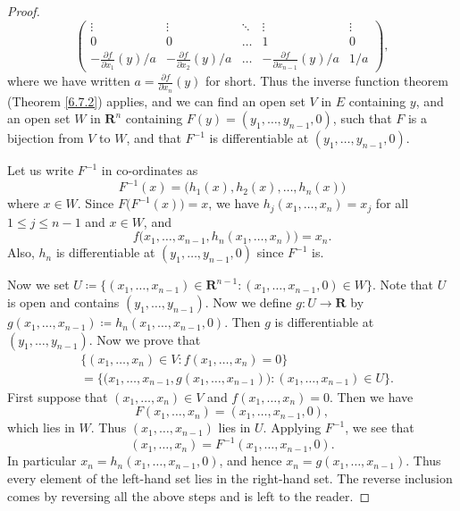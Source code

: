 \begin{proof}
\[\begin{pmatrix}
            \vdots                                  & \vdots                                  & \ddots & \vdots                                        & \vdots \\
            0                                       & 0                                       & \dots  & 1                                             & 0      \\
            -\frac{\partial f}{\partial x_1}(y) / a & -\frac{\partial f}{\partial x_2}(y) / a & \dots  & -\frac{\partial f}{\partial x_{n - 1}}(y) / a & 1 / a
        \end{pmatrix},
    \]
    where we have written \(a = \frac{\partial f}{\partial x_n}(y)\) for short.
    Thus the inverse function theorem (Theorem \ref{6.7.2}) applies, and we can find an open set \(V\) in \(E\) containing \(y\), and an open set \(W\) in \(\mathbf{R}^n\) containing \(F(y) = (y_1, \dots, y_{n - 1}, 0)\), such that \(F\) is a bijection from \(V\) to \(W\), and that \(F^{-1}\) is differentiable at \((y_1, \dots, y_{n - 1}, 0)\).

    Let us write \(F^{-1}\) in co-ordinates as
    \[
        F^{-1}(x) = \big(h_1(x), h_2(x), \dots, h_n(x)\big)
    \]
    where \(x \in W\).
    Since \(F\big(F^{-1}(x)\big) = x\), we have \(h_j(x_1, \dots, x_n) = x_j\) for all \(1 \leq j \leq n - 1\) and \(x \in W\), and
    \[
        f\big(x_1, \dots, x_{n - 1}, h_n(x_1, \dots, x_n)\big) = x_n.
    \]
    Also, \(h_n\) is differentiable at \((y_1, \dots, y_{n - 1}, 0)\) since \(F^{-1}\) is.

    Now we set \(U \coloneqq \{(x_1, \dots, x_{n - 1}) \in \mathbf{R}^{n - 1} : (x_1, \dots, x_{n - 1}, 0) \in W\}\).
    Note that \(U\) is open and contains \((y_1, \dots, y_{n - 1})\).
    Now we define \(g : U \to \mathbf{R}\) by \(g(x_1, \dots, x_{n - 1}) \coloneqq h_n(x_1, \dots, x_{n - 1}, 0)\).
    Then \(g\) is differentiable at \((y_1, \dots, y_{n - 1})\).
    Now we prove that
    \begin{align*}
         & \{(x_1, \dots, x_n) \in V : f(x_1, \dots, x_n) = 0\}                                                     \\
         & = \Big\{\big(x_1, \dots, x_{n - 1}, g(x_1, \dots, x_{n - 1})\big) : (x_1, \dots, x_{n - 1}) \in U\Big\}.
    \end{align*}
    First suppose that \((x_1, \dots, x_n) \in V\) and \(f(x_1, \dots, x_n) = 0\).
    Then we have
    \[
        F(x_1, \dots, x_n) = (x_1, \dots, x_{n - 1}, 0),
    \]
    which lies in \(W\).
    Thus \((x_1, \dots, x_{n - 1})\) lies in \(U\).
    Applying \(F^{-1}\), we see that
    \[
        (x_1, \dots, x_n) = F^{-1}(x_1, \dots, x_{n - 1}, 0).
    \]
    In particular \(x_n = h_n(x_1, \dots, x_{n - 1}, 0)\), and hence \(x_n = g(x_1, \dots, x_{n - 1})\).
    Thus every element of the left-hand set lies in the right-hand set.
    The reverse inclusion comes by reversing all the above steps and is left to the reader.


\end{proof}

